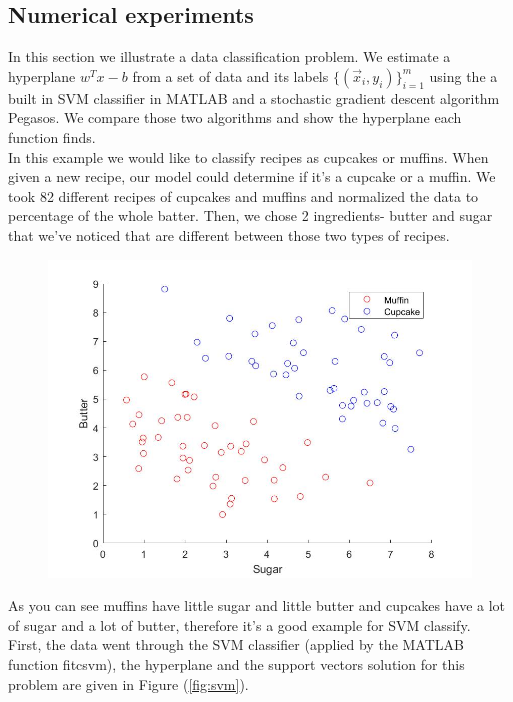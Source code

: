 \documentclass[12pt]{article}
\begin{document}
\subsection{Numerical experiments}
In this section we illustrate a data classification problem. We estimate a hyperplane $w^Tx-b$ from a set of data and its labels $\{(\vec{x}_i,y_i)\}_{i=1}^{m}$ using the a built in SVM classifier in MATLAB and a stochastic gradient descent algorithm Pegasos. We compare those two algorithms and show the hyperplane each function finds.\\
In this example we would like to classify recipes as cupcakes or muffins. When given a new recipe, our model could determine if it's a cupcake or a muffin. We took 82 different recipes of cupcakes and muffins and normalized the data to percentage of the whole batter. Then, we chose 2 ingredients- butter and sugar that we've noticed that are different between those two types of recipes.   
\begin{figure}[H]
  \centering
    \includegraphics[scale=0.3]{sugarbutter.jpg}
 \end{figure}
As you can see muffins have little sugar and little butter and cupcakes have a lot of sugar and a lot of butter, therefore it's a good example for SVM classify.\\ 
First, the data went through the SVM classifier (applied by the MATLAB function fitcsvm), the hyperplane and the support vectors solution for this problem are given in Figure (\ref{fig:svm}).
\end{document}
